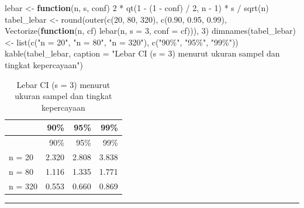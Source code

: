 \documentclass[
  indonesian,
  letterpaper,
]{book}
\newenvironment{Shaded}{\begin{snugshade}}{\end{snugshade}}
\newcommand{\AttributeTok}[1]{\textcolor[rgb]{0.40,0.45,0.13}{#1}}
\newcommand{\ControlFlowTok}[1]{\textcolor[rgb]{0.00,0.23,0.31}{\textbf{#1}}}
\newcommand{\DecValTok}[1]{\textcolor[rgb]{0.68,0.00,0.00}{#1}}
\newcommand{\FloatTok}[1]{\textcolor[rgb]{0.68,0.00,0.00}{#1}}
\newcommand{\FunctionTok}[1]{\textcolor[rgb]{0.28,0.35,0.67}{#1}}
\newcommand{\NormalTok}[1]{\textcolor[rgb]{0.00,0.23,0.31}{#1}}
\newcommand{\OtherTok}[1]{\textcolor[rgb]{0.00,0.23,0.31}{#1}}
\newcommand{\SpecialCharTok}[1]{\textcolor[rgb]{0.37,0.37,0.37}{#1}}
\newcommand{\StringTok}[1]{\textcolor[rgb]{0.13,0.47,0.30}{#1}}
\begin{document}
\begin{Shaded}
\begin{Highlighting}[]
\NormalTok{lebar }\OtherTok{\textless{}{-}} \ControlFlowTok{function}\NormalTok{(n, s, conf) }\DecValTok{2} \SpecialCharTok{*} \FunctionTok{qt}\NormalTok{(}\DecValTok{1} \SpecialCharTok{{-}}\NormalTok{ (}\DecValTok{1} \SpecialCharTok{{-}}\NormalTok{ conf) }\SpecialCharTok{/} \DecValTok{2}\NormalTok{, n }\SpecialCharTok{{-}} \DecValTok{1}\NormalTok{) }\SpecialCharTok{*}\NormalTok{ s }\SpecialCharTok{/} \FunctionTok{sqrt}\NormalTok{(n)}
\NormalTok{tabel\_lebar }\OtherTok{\textless{}{-}} \FunctionTok{round}\NormalTok{(}\FunctionTok{outer}\NormalTok{(}\FunctionTok{c}\NormalTok{(}\DecValTok{20}\NormalTok{, }\DecValTok{80}\NormalTok{, }\DecValTok{320}\NormalTok{), }\FunctionTok{c}\NormalTok{(}\FloatTok{0.90}\NormalTok{, }\FloatTok{0.95}\NormalTok{, }\FloatTok{0.99}\NormalTok{),}
                           \FunctionTok{Vectorize}\NormalTok{(}\ControlFlowTok{function}\NormalTok{(n, cf) }\FunctionTok{lebar}\NormalTok{(n, }\AttributeTok{s =} \DecValTok{3}\NormalTok{, }\AttributeTok{conf =}\NormalTok{ cf))), }\DecValTok{3}\NormalTok{)}
\FunctionTok{dimnames}\NormalTok{(tabel\_lebar) }\OtherTok{\textless{}{-}} \FunctionTok{list}\NormalTok{(}\FunctionTok{c}\NormalTok{(}\StringTok{"n = 20"}\NormalTok{, }\StringTok{"n = 80"}\NormalTok{, }\StringTok{"n = 320"}\NormalTok{), }\FunctionTok{c}\NormalTok{(}\StringTok{"90\%"}\NormalTok{, }\StringTok{"95\%"}\NormalTok{, }\StringTok{"99\%"}\NormalTok{))}
\FunctionTok{kable}\NormalTok{(tabel\_lebar, }\AttributeTok{caption =} \StringTok{"Lebar CI (s = 3) menurut ukuran sampel dan tingkat kepercayaan"}\NormalTok{)}
\end{Highlighting}
\end{Shaded}

\begin{longtable}[]{@{}lrrr@{}}
\caption{Lebar CI (s = 3) menurut ukuran sampel dan tingkat
kepercayaan}\tabularnewline
\toprule\noalign{}
& 90\% & 95\% & 99\% \\
\midrule\noalign{}
\endfirsthead
\toprule\noalign{}
& 90\% & 95\% & 99\% \\
\midrule\noalign{}
\endhead
\bottomrule\noalign{}
\endlastfoot
n = 20 & 2.320 & 2.808 & 3.838 \\
n = 80 & 1.116 & 1.335 & 1.771 \\
n = 320 & 0.553 & 0.660 & 0.869 \\
\end{longtable}

\begin{center}\rule{0.5\linewidth}{0.5pt}\end{center}
\end{document}
